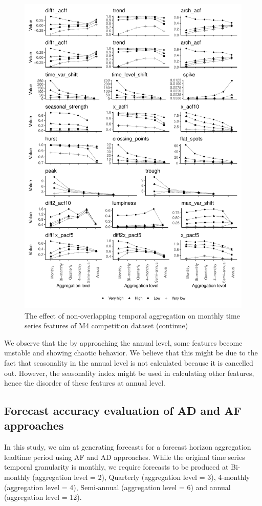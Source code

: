 \documentclass[preprint, 3p,
authoryear]{elsarticle} %
\begin{document}
\begin{figure}[H]

{\centering \includegraphics[width=0.7\linewidth]{img/mp_category_all2} 

}

\caption{The effect of non-overlapping temporal aggregation on monthly time series features of M4 competition dataset (continue)}\label{fig:featureagg2}
\end{figure}

We observe that the by approaching the annual level, some features
become unstable and showing chaotic behavior. We believe that this might
be due to the fact that seasonality in the annual level is not
calculated because it is cancelled out. However, the seasonality index
might be used in calculating other features, hence the disorder of these
features at annual level.

\hypertarget{forecast-accuracy-evaluation-of-ad-and-af-approaches}{%
\subsection{Forecast accuracy evaluation of AD and AF
approaches}\label{forecast-accuracy-evaluation-of-ad-and-af-approaches}}

In this study, we aim at generating forecasts for a forecast horizon
aggregation leadtime period using AF and AD approaches. While the
original time series temporal granularity is monthly, we require
forecasts to be produced at Bi-monthly (aggregation level = 2),
Quarterly (aggregation level = 3), 4-monthly (aggregation level = 4),
Semi-annual (aggregation level = 6) and annual (aggregation level = 12).
\end{document}

